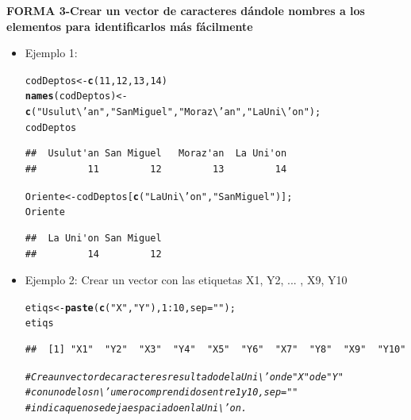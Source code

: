 \documentclass[12pt,letterpaper]{article}\usepackage[]{graphicx}\usepackage[]{color}
\makeatletter
\newcommand{\hlnum}[1]{\textcolor[rgb]{0.686,0.059,0.569}{#1}}%
\newcommand{\hlstr}[1]{\textcolor[rgb]{0.192,0.494,0.8}{#1}}%
\newcommand{\hlcom}[1]{\textcolor[rgb]{0.678,0.584,0.686}{\textit{#1}}}%
\newcommand{\hlopt}[1]{\textcolor[rgb]{0,0,0}{#1}}%
\newcommand{\hlstd}[1]{\textcolor[rgb]{0.345,0.345,0.345}{#1}}%
\newcommand{\hlkwb}[1]{\textcolor[rgb]{0.69,0.353,0.396}{#1}}%
\newcommand{\hlkwc}[1]{\textcolor[rgb]{0.333,0.667,0.333}{#1}}%
\newcommand{\hlkwd}[1]{\textcolor[rgb]{0.737,0.353,0.396}{\textbf{#1}}}%
\newenvironment{kframe}{%
 \def\at@end@of@kframe{}%
 \ifinner\ifhmode%
  \def\at@end@of@kframe{\end{minipage}}%
  \begin{minipage}{\columnwidth}%
 \fi\fi%
 \def\FrameCommand##1{\hskip\@totalleftmargin \hskip-\fboxsep
 \colorbox{shadecolor}{##1}\hskip-\fboxsep
     \hskip-\linewidth \hskip-\@totalleftmargin \hskip\columnwidth}%
 \MakeFramed {\advance\hsize-\width
   \@totalleftmargin\z@ \linewidth\hsize
   \@setminipage}}%
 {\par\unskip\endMakeFramed%
 \at@end@of@kframe}
\newenvironment{knitrout}{}{} %
\makeatother
\begin{document}
\textbf {FORMA 3-Crear un vector de caracteres d\'andole nombres a los elementos para identificarlos m\'as f\'acilmente}
\begin{itemize}
\item Ejemplo 1:
\begin{knitrout}
\color{fgcolor}\begin{kframe}
\begin{alltt}
\hlstd{codDeptos} \hlkwb{<-} \hlkwd{c}\hlstd{(}\hlnum{11}\hlstd{,} \hlnum{12}\hlstd{,} \hlnum{13}\hlstd{,} \hlnum{14}\hlstd{)}
\hlkwd{names}\hlstd{(codDeptos)} \hlkwb{<-} \hlkwd{c}\hlstd{(}\hlstr{"Usulut\textbackslash{}'an"}\hlstd{,} \hlstr{"San Miguel"}\hlstd{,} \hlstr{"Moraz\textbackslash{}'an"}\hlstd{,} \hlstr{"La Uni\textbackslash{}'on"}\hlstd{);}
\hlstd{codDeptos}
\end{alltt}
\begin{verbatim}
##  Usulut'an San Miguel   Moraz'an  La Uni'on 
##         11         12         13         14
\end{verbatim}
\begin{alltt}
\hlstd{Oriente} \hlkwb{<-} \hlstd{codDeptos [}\hlkwd{c}\hlstd{(}\hlstr{"La Uni\textbackslash{}'on"}\hlstd{,} \hlstr{"San Miguel"}\hlstd{)];}
\hlstd{Oriente}
\end{alltt}
\begin{verbatim}
##  La Uni'on San Miguel 
##         14         12
\end{verbatim}
\end{kframe}
\end{knitrout}
\item Ejemplo 2: Crear un vector con las etiquetas X1, Y2, ... , X9, Y10
\begin{knitrout}
\color{fgcolor}\begin{kframe}
\begin{alltt}
\hlstd{etiqs}\hlkwb{<-}\hlkwd{paste}\hlstd{(}\hlkwd{c}\hlstd{(}\hlstr{"X"}\hlstd{,} \hlstr{"Y"}\hlstd{),} \hlnum{1}\hlopt{:}\hlnum{10}\hlstd{,} \hlkwc{sep}\hlstd{=}\hlstr{""}\hlstd{);}
\hlstd{etiqs}
\end{alltt}
\begin{verbatim}
##  [1] "X1"  "Y2"  "X3"  "Y4"  "X5"  "Y6"  "X7"  "Y8"  "X9"  "Y10"
\end{verbatim}
\begin{alltt}
\hlcom{# Crea un vector de caracteres resultado de la Uni\textbackslash{}'on de "X" o de "Y"}
\hlcom{# con uno de los n\textbackslash{}'umero comprendidos entre 1 y 10, sep=""}
\hlcom{# indica que no se deja espaciado en la Uni\textbackslash{}'on.}
\end{alltt}
\end{kframe}
\end{knitrout}
\end{itemize}
\newpage
\end{document}
